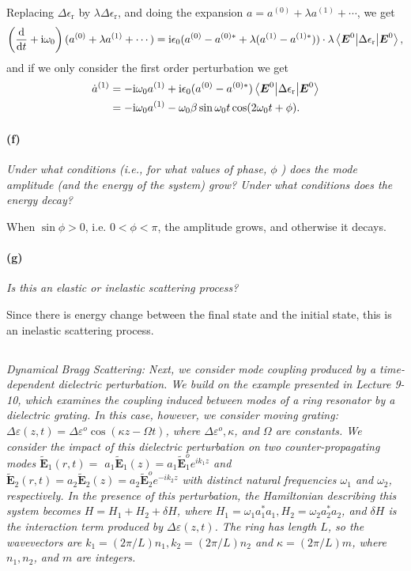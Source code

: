 \documentclass[hyperref, a4paper]{article}
\newcommand*{\ii}{\mathrm{i}}
\newcommand{\epsr}{\epsilon_{\text{r}}}
\begin{document}
Replacing $\Delta \epsr$ by $\lambda \Delta \epsr$, 
and doing the expansion $a = a^{(0)} + \lambda a^{(1)} + \cdots$, we get 
\[
    \left( \dv{t} + \ii \omega_0 \right) (a^{(0)} + \lambda a^{(1)} + \cdots )
    = \ii \epsilon_0 (a^{(0)} - a^{(0) *} + \lambda (a^{(1)} - a^{(1)*})) \cdot \lambda \mel**{\vb*{E}^0}{\Delta \epsr}{\vb*{E}^0},
\]
and if we only consider the first order perturbation we get 
\begin{equation}
    \begin{aligned}
        \dot{a}^{(1)} &= - \ii \omega_0 a^{(1)} + \ii \epsilon_0 (a^{(0)} - a^{(0)*}) \mel**{\vb*{E}^0}{\Delta \epsr}{\vb*{E}^0} \\
        &= - \ii \omega_0 a^{(1)} - \omega_0 \beta \sin \omega_0 t \cos(2 \omega_0 t + \phi).
    \end{aligned} 
\end{equation}

\paragraph*{(f)} \textit{Under what conditions (i.e., for what values of phase, $\phi$ ) does the mode amplitude (and the energy of the system) grow? Under what conditions does the energy decay?} 

When $\sin \phi > 0$, i.e. $0 < \phi < \pi$, the amplitude grows, 
and otherwise it decays.

\paragraph*{(g)} \textit{Is this an elastic or inelastic scattering process?} 

Since there is energy change between the final state and the initial state, 
this is an inelastic scattering process.

\subsection{}

\textit{Dynamical Bragg Scattering: Next, we consider mode coupling produced by a time-dependent dielectric perturbation. We build on the example presented in Lecture 9-10, which examines the coupling induced between modes of a ring resonator by a dielectric grating. In this case, however, we consider moving grating: $\Delta \varepsilon(z, t)=\Delta \varepsilon^o \cos (\kappa z-\Omega t)$, where $\Delta \varepsilon^o, \kappa$, and $\Omega$ are constants. We consider the impact of this dielectric perturbation on two counter-propagating modes $\tilde{\mathbf{E}}_1(r, t)=$ $a_1 \tilde{\mathbf{E}}_1(z)=a_1 \tilde{\mathbf{E}}_1^o e^{i k_1 z}$ and $\tilde{\mathbf{E}}_2(r, t)=a_2 \tilde{\mathbf{E}}_2(z)=a_2 \tilde{\mathbf{E}}_2^o e^{-i k_2 z}$ with distinct natural frequencies $\omega_1$ and $\omega_2$, respectively. In the presence of this perturbation, the Hamiltonian describing this system becomes $H=H_1+H_2+\delta H$, where $H_1=\omega_1 a_1^* a_1, H_2=\omega_2 a_2^* a_2$, and $\delta H$ is the interaction term produced by $\Delta \varepsilon(z, t)$. The ring has length $L$, so the wavevectors are $k_1=(2 \pi / L) n_1, k_2=(2 \pi / L) n_2$ and $\kappa=(2 \pi / L) m$, where $n_1, n_2$, and $m$ are integers.}
\end{document}
